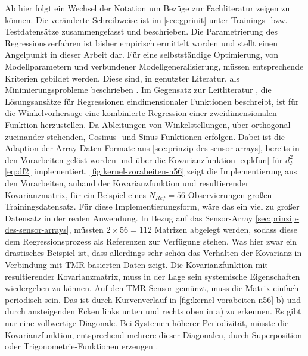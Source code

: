 \clearpage


Ab hier folgt ein Wechsel der Notation um Bezüge zur Fachliteratur \cite{Rasmussen2006} zeigen zu können. Die veränderte Schreibweise ist im \autoref{sec:gprinit} unter Trainings- bzw. Testdatensätze zusammengefasst und beschrieben.
\newline
Die Parametrierung des Regressionsverfahren ist bisher empirisch ermittelt worden und stellt einen Angelpunkt in dieser Arbeit dar. Für eine selbstständige Optimierung, von Modellparametern und verbundener Modellgeneralisierung, müssen entsprechende Kriterien gebildet werden. Diese sind, in genutzter Literatur, als Minimierungsprobleme beschrieben \cite{Rasmussen2006}\cite{Guerrero2014}\cite{Lang2014}. 
\newline
Im Gegensatz zur Leitliteratur \cite{Rasmussen2006}, die Lösungsansätze für Regressionen eindimensionaler Funktionen beschreibt, ist für die Winkelvorhersage eine kombinierte Regression einer zweidimensionalen Funktion herzustellen. Da Ableitungen von Winkelstellungen, über orthogonal zueinander stehenden, Cosinus- und Sinus-Funktionen erfolgen. Dabei ist die Adaption der Array-Daten-Formate aus \autoref{sec:prinzip-des-sensor-arrays}, bereits in den Vorarbeiten gelöst worden \cite{Schuethe2020} und über die Kovarianzfunktion \autoref{eq:kfun} für $d_F^2$ \autoref{eq:df2} implementiert. \autoref{fig:kernel-vorabeiten-n56} zeigt die Implementierung aus den Vorarbeiten, anhand der Kovarianzfunktion und resultierender Kovarianzmatrix, für ein Beispiel eines $N_{Ref} = 56$ Observierungen großen Trainingsdatensatz. Für diese Implementierungsform, wäre das ein viel zu großer Datensatz in der realen Anwendung. In Bezug auf das Sensor-Array \autoref{sec:prinzip-des-sensor-arrays}, müssten $2 \times 56 = 112$ Matrizen abgelegt werden, sodass diese dem Regressionsprozess als Referenzen zur Verfügung stehen. Was hier zwar ein drastisches Beispiel ist, dass allerdings sehr schön das Verhalten der Kovarianz in Verbindung mit TMR basierten Daten zeigt.
\newline
Die Kovarianzfunktion mit resultierender Kovarianzmatrix, muss in der Lage sein systemische Eigenschaften wiedergeben zu können. Auf den TMR-Sensor \cite{TDK2016} gemünzt, muss die Matrix einfach periodisch sein. Das ist durch Kurvenverlauf in \autoref{fig:kernel-vorabeiten-n56} b) und durch ansteigenden Ecken links unten und rechts oben in a) zu erkennen. Es gibt nur eine vollwertige Diagonale. Bei Systemen höherer Periodizität, müsste die Kovarianzfunktion, entsprechend mehrere dieser Diagonalen, durch Superposition oder Trigonometrie-Funktionen erzeugen \cite{Rasmussen2006}.


